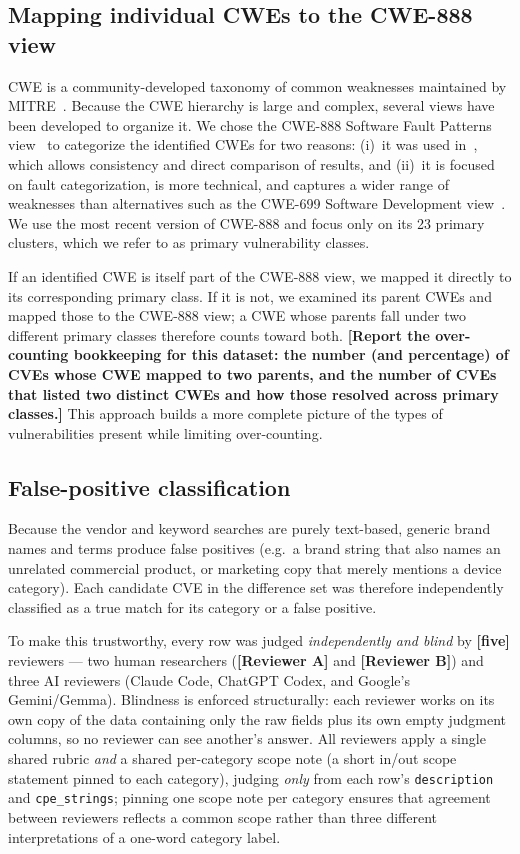 \documentclass[conference]{IEEEtran}
\newcommand{\stub}[1][?]{{\color{red}\textbf{[#1]}}}
\begin{document}
\subsection{Mapping individual CWEs to the CWE-888 view}
\label{sec:method-cwe888}

CWE is a community-developed taxonomy of common weaknesses maintained by
MITRE~\cite{ref-cwe}. Because the CWE hierarchy is large and complex, several
views have been developed to organize it. We chose the CWE-888 Software Fault
Patterns view~\cite{ref-cwe888} to categorize the identified CWEs for two
reasons: (i)~it was used in~\cite{ref-mcsoftware}, which allows consistency and
direct comparison of results, and (ii)~it is focused on fault categorization, is
more technical, and captures a wider range of weaknesses than alternatives such
as the CWE-699 Software Development view~\cite{ref-cwe699}. We use the most recent
version of CWE-888 and focus only on its 23 primary clusters, which we refer to
as primary vulnerability classes.

If an identified CWE is itself part of the CWE-888 view, we mapped it directly to
its corresponding primary class. If it is not, we examined its parent CWEs and
mapped those to the CWE-888 view; a CWE whose parents fall under two different
primary classes therefore counts toward both. \stub[Report the over-counting
bookkeeping for this dataset: the number (and percentage) of CVEs whose CWE
mapped to two parents, and the number of CVEs that listed two distinct CWEs and
how those resolved across primary classes.] This approach builds a more complete
picture of the types of vulnerabilities present while limiting over-counting.

\subsection{False-positive classification}
\label{sec:method-review}

Because the vendor and keyword searches are purely text-based, generic brand names
and terms produce false positives (e.g.\ a brand string that also names an
unrelated commercial product, or marketing copy that merely mentions a device
category). Each candidate CVE in the difference set was therefore independently
classified as a true match for its category or a false positive.

To make this trustworthy, every row was judged \emph{independently and blind} by
\stub[five] reviewers --- two human researchers (\stub[Reviewer A] and
\stub[Reviewer B]) and three AI reviewers (Claude Code, ChatGPT Codex, and
Google's Gemini/Gemma). Blindness is enforced structurally: each reviewer works
on its own copy of the data containing only the raw fields plus its own empty
judgment columns, so no reviewer can see another's answer. All reviewers apply a
single shared rubric \emph{and} a shared per-category scope note (a short in/out
scope statement pinned to each category), judging \emph{only} from each row's
\texttt{description} and \texttt{cpe\_strings}; pinning one scope note per category
ensures that agreement between reviewers reflects a common scope rather than three
different interpretations of a one-word category label.
\end{document}

